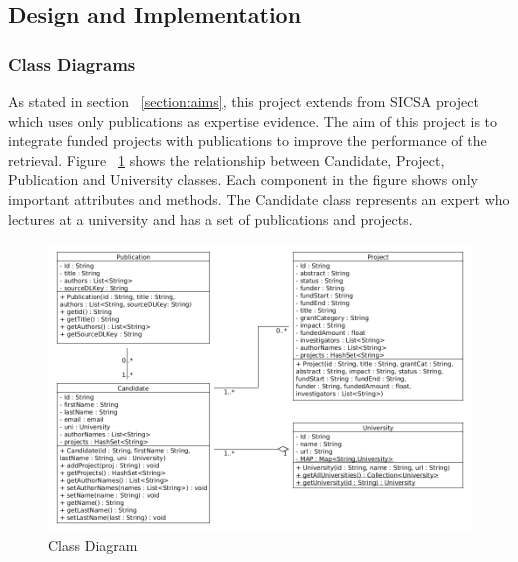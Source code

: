 


\subsection{Design and Implementation}

\subsubsection{Class Diagrams}

As stated in section ~\ref{section:aims}, this project extends from SICSA project which uses only publications as expertise evidence.
The aim of this project is to integrate funded projects with publications to improve the performance of the retrieval.
Figure ~\ref{fig:classDiagram1} shows the relationship between Candidate, Project, Publication and University classes. Each component in the figure
shows only important attributes and methods. The Candidate class represents an expert who lectures at a university and has a set of publications and projects.
\begin{figure}
\centering
\includegraphics[scale=0.4]{./figures/classDiagram1.png}
\caption{Class Diagram} \label{fig:classDiagram1} 
\end{figure}

